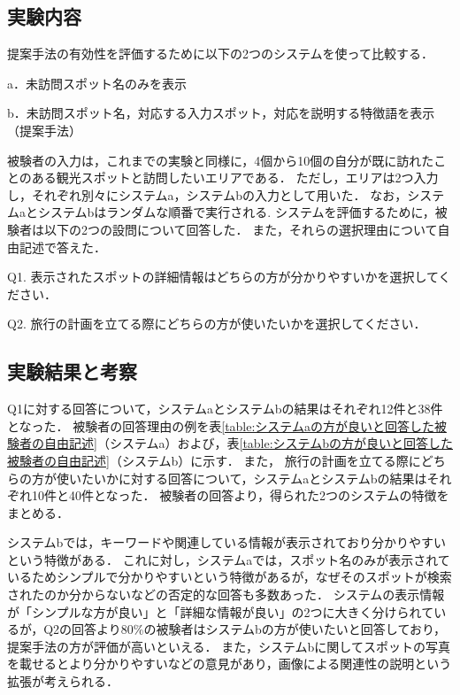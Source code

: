 \documentclass[submit]{ipsj}
\begin{document}
\subsection{実験内容}
提案手法の有効性を評価するために以下の2つのシステムを使って比較する．
\begin{description}
  \item a．未訪問スポット名のみを表示
  \item b．未訪問スポット名，対応する入力スポット，対応を説明する特徴語を表示（提案手法）
\end{description}

被験者の入力は，これまでの実験と同様に，4個から10個の自分が既に訪れたことのある観光スポットと訪問したいエリアである．
ただし，エリアは2つ入力し，それぞれ別々にシステムa，システムbの入力として用いた．
なお，システムaとシステムbはランダムな順番で実行される.
システムを評価するために，被験者は以下の2つの設問について回答した．
また，それらの選択理由について自由記述で答えた．

\begin{description}
  \item Q1. 表示されたスポットの詳細情報はどちらの方が分かりやすいかを選択してください．
  \item Q2. 旅行の計画を立てる際にどちらの方が使いたいかを選択してください．
\end{description}

\subsection{実験結果と考察}
Q1に対する回答について，システムaとシステムbの結果はそれぞれ12件と38件となった．
被験者の回答理由の例を表\ref{table:システムaの方が良いと回答した被験者の自由記述}（システムa）および，表\ref{table:システムbの方が良いと回答した被験者の自由記述}（システムb）に示す．
また，
旅行の計画を立てる際にどちらの方が使いたいかに対する回答について，システムaとシステムbの結果はそれぞれ10件と40件となった．
被験者の回答より，得られた2つのシステムの特徴をまとめる．

システムbでは，キーワードや関連している情報が表示されており分かりやすいという特徴がある．
これに対し，システムaでは，スポット名のみが表示されているためシンプルで分かりやすいという特徴があるが，なぜそのスポットが検索されたのか分からないなどの否定的な回答も多数あった．
システムの表示情報が「シンプルな方が良い」と「詳細な情報が良い」の2つに大きく分けられているが，Q2の回答より80\%の被験者はシステムbの方が使いたいと回答しており，提案手法の方が評価が高いといえる．
また，システムbに関してスポットの写真を載せるとより分かりやすいなどの意見があり，画像による関連性の説明という拡張が考えられる．
\end{document}
